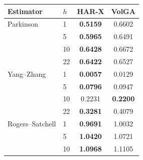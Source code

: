 \begin{tabular}{ll cc}
\toprule
Estimator & $h$ & HAR-X & VolGA \\
\midrule
Parkinson & 1 & \textbf{0.5159} & 0.6602 \\
 & 5 & \textbf{0.5965} & 0.6491 \\
 & 10 & \textbf{0.6428} & 0.6672 \\
 & 22 & \textbf{0.6422} & 0.6527 \\
\midrule
Yang--Zhang & 1 & \textbf{0.0057} & 0.0129 \\
 & 5 & \textbf{0.0796} & 0.0947 \\
 & 10 & 0.2231 & \textbf{0.2200} \\
 & 22 & \textbf{0.3281} & 0.4079 \\
\midrule
Rogers--Satchell & 1 & \textbf{0.9691} & 1.0032 \\
 & 5 & \textbf{1.0420} & 1.0721 \\
 & 10 & \textbf{1.0968} & 1.1105 \\
\bottomrule
\end{tabular}
